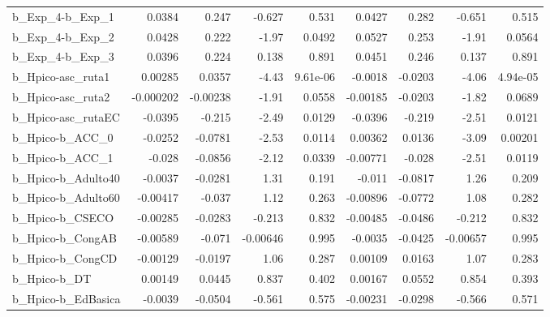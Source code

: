 \begin{tabular}{lrrrrrrrr}
b\_Exp\_4-b\_Exp\_1            &      0.0384 &        0.247 &    -0.627 &    0.531 &     0.0427 &       0.282 &       -0.651 &         0.515 \\
b\_Exp\_4-b\_Exp\_2            &      0.0428 &        0.222 &     -1.97 &   0.0492 &     0.0527 &       0.253 &        -1.91 &        0.0564 \\
b\_Exp\_4-b\_Exp\_3            &      0.0396 &        0.224 &     0.138 &    0.891 &     0.0451 &       0.246 &        0.137 &         0.891 \\
b\_Hpico-asc\_ruta1          &     0.00285 &       0.0357 &     -4.43 & 9.61e-06 &    -0.0018 &     -0.0203 &        -4.06 &      4.94e-05 \\
b\_Hpico-asc\_ruta2          &   -0.000202 &     -0.00238 &     -1.91 &   0.0558 &   -0.00185 &     -0.0203 &        -1.82 &        0.0689 \\
b\_Hpico-asc\_rutaEC         &     -0.0395 &       -0.215 &     -2.49 &   0.0129 &    -0.0396 &      -0.219 &        -2.51 &        0.0121 \\
b\_Hpico-b\_ACC\_0            &     -0.0252 &      -0.0781 &     -2.53 &   0.0114 &    0.00362 &      0.0136 &        -3.09 &       0.00201 \\
b\_Hpico-b\_ACC\_1            &      -0.028 &      -0.0856 &     -2.12 &   0.0339 &   -0.00771 &      -0.028 &        -2.51 &        0.0119 \\
b\_Hpico-b\_Adulto40         &     -0.0037 &      -0.0281 &      1.31 &    0.191 &     -0.011 &     -0.0817 &         1.26 &         0.209 \\
b\_Hpico-b\_Adulto60         &    -0.00417 &       -0.037 &      1.12 &    0.263 &   -0.00896 &     -0.0772 &         1.08 &         0.282 \\
b\_Hpico-b\_CSECO            &    -0.00285 &      -0.0283 &    -0.213 &    0.832 &   -0.00485 &     -0.0486 &       -0.212 &         0.832 \\
b\_Hpico-b\_CongAB           &    -0.00589 &       -0.071 &  -0.00646 &    0.995 &    -0.0035 &     -0.0425 &     -0.00657 &         0.995 \\
b\_Hpico-b\_CongCD           &    -0.00129 &      -0.0197 &      1.06 &    0.287 &    0.00109 &      0.0163 &         1.07 &         0.283 \\
b\_Hpico-b\_DT               &     0.00149 &       0.0445 &     0.837 &    0.402 &    0.00167 &      0.0552 &        0.854 &         0.393 \\
b\_Hpico-b\_EdBasica         &     -0.0039 &      -0.0504 &    -0.561 &    0.575 &   -0.00231 &     -0.0298 &       -0.566 &         0.571 \\

\end{tabular}

